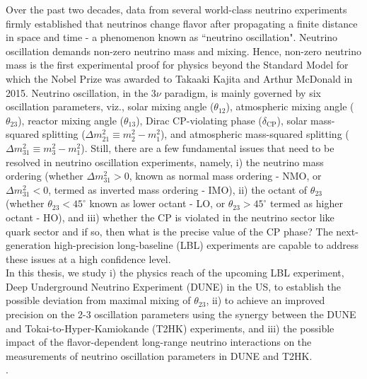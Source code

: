 \par Over the past two decades, data from several world-class neutrino experiments firmly established that neutrinos change flavor after propagating a finite distance in space and time - a phenomenon known as ``neutrino oscillation". Neutrino oscillation demands non-zero neutrino mass and mixing. Hence, non-zero neutrino mass is the first experimental proof for physics beyond the Standard Model for which the Nobel Prize was awarded to Takaaki Kajita and Arthur McDonald in 2015. Neutrino oscillation, in the $3\nu$ paradigm, is mainly governed by six oscillation parameters, viz., solar mixing angle ($\theta_{12}$), atmospheric mixing angle ($\theta_{23}$), reactor mixing angle ($\theta_{13}$), Dirac CP-violating phase ($\delta_{\mathrm{CP}}$), solar mass-squared splitting ($\Delta m^2_{21} \equiv m^2_{2}-m^2_{1}$), and atmospheric mass-squared splitting ($\Delta m^2_{31} \equiv m^2_{3}-m^2_{1}$). Still, there are a few fundamental issues that need to be resolved in neutrino oscillation experiments, namely, i) the neutrino mass ordering (whether $\Delta m^2_{31}>0$, known as normal mass ordering - NMO, or $\Delta m^2_{31}<0$, termed as inverted mass ordering - IMO), ii) the octant of $\theta_{23}$ (whether $\theta_{23}<45^\circ$ known as lower octant - LO, or $\theta_{23}>45^\circ$ termed as higher octant - HO), and iii) whether the CP is violated in the neutrino sector like quark sector and if so, then what is the precise value of the CP phase? The next-generation high-precision long-baseline (LBL) experiments are capable to address these issues at a high confidence level. \\\vspace{0.1cm}
In this thesis, we study i) the physics reach of the upcoming LBL experiment, Deep Underground Neutrino Experiment (DUNE) in the US, to establish the possible deviation from maximal mixing of $\theta_{23}$, ii) to achieve an improved precision on the 2-3 oscillation parameters using the synergy between the DUNE and Tokai-to-Hyper-Kamiokande (T2HK) experiments, and iii) the possible impact of the flavor-dependent long-range neutrino interactions on the measurements of neutrino oscillation parameters in DUNE and T2HK.\\
.
